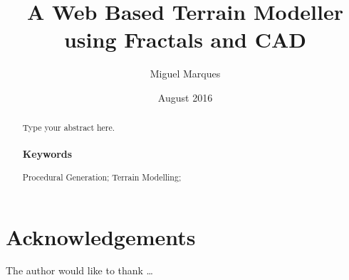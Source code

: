 \documentclass[12pt, oneside]{book}
\title{A Web Based Terrain Modeller using Fractals and CAD}
\author{Miguel Marques}
\date{August 2016}
\begin{document}
%
%

\frontmatter

\maketitle

\pagestyle{plain}

\begin{abstract}
    Type your abstract here.

	\subsubsection*{Keywords}
	Procedural Generation; Terrain Modelling; 
\end{abstract}

\chapter{Acknowledgements}
The author would like to thank \dots

\sstableofcontents

\sslistoffigures

\sslistoftables

\sslistofequations

\begin{listofabbreviations}
\end{listofabbreviations}


%
%
\mainmatter








\begin{references}
	
\end{references}

%
\end{document}
